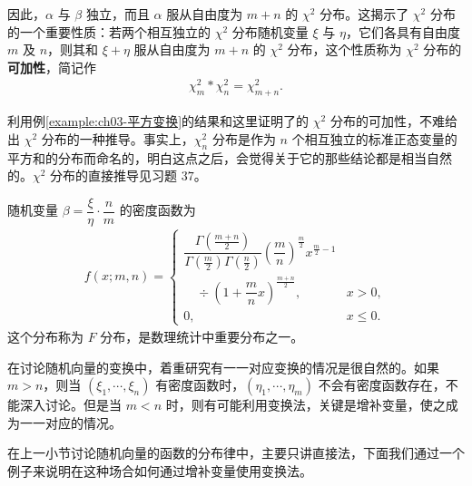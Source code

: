 \documentclass[../../main.tex]{subfiles}
\begin{document}
\begin{example}
因此，$\alpha$ 与 $\beta$ 独立，而且 $\alpha$ 服从自由度为 $m+n$ 的 $\chi^{2}$ 分布。这揭示了 $\chi^{2}$ 分布的一个重要性质：若两个相互独立的 $\chi^{2}$ 分布随机变量 $\xi$ 与 $\eta$，它们各具有自由度 $m$ 及 $n$，则其和 $\xi+\eta$ 服从自由度为 $m+n$ 的 $\chi^{2}$ 分布，这个性质称为 $\chi^{2}$ 分布的\textbf{可加性}，简记作
\begin{align}
\chi_m^{2}*\chi_n^{2}=\chi_{m+n}^{2}.\label{align:ch03-卡方可加}
\end{align}

利用例\ref{example:ch03-平方变换}的结果和这里证明了的 $\chi^{2}$ 分布的可加性，不难给出 $\chi^{2}$ 分布的一种推导。事实上，$\chi_n^{2}$ 分布是作为 $n$ 个相互独立的标准正态变量的平方和的分布而命名的，明白这点之后，会觉得关于它的那些结论都是相当自然的。$\chi^{2}$ 分布的直接推导见习题 $37$。

随机变量 $\beta=\dfrac{\xi}{\eta}\cdot\dfrac{n}{m}$ 的密度函数为
\begin{align}
f(x;m,n)=
\begin{cases}
\dfrac{\Gamma\!\left(\frac{m+n}{2}\right)}{\Gamma\!\left(\frac{m}{2}\right)\Gamma\!\left(\frac{n}{2}\right)}\left(\dfrac{m}{n}\right)^{\frac{m}{2}}x^{\frac{m}{2}-1}\\[4pt]
\quad\div\left(1+\dfrac{m}{n}x\right)^{\frac{m+n}{2}}, & x>0,\\[4pt]
0, & x\leqslant 0.
\end{cases}\label{align:ch03-F分布}
\end{align}
这个分布称为 $F$ 分布，是数理统计中重要分布之一。
\end{example}

在讨论随机向量的变换中，着重研究有一一对应变换的情况是很自然的。如果 $m>n$，则当 $(\xi_1,\cdots,\xi_n)$ 有密度函数时，$(\eta_1,\cdots,\eta_m)$ 不会有密度函数存在，不能深入讨论。但是当 $m<n$ 时，则有可能利用变换法，关键是增补变量，使之成为一一对应的情况。

在上一小节讨论随机向量的函数的分布律中，主要只讲直接法，下面我们通过一个例子来说明在这种场合如何通过增补变量使用变换法。
\end{document}
